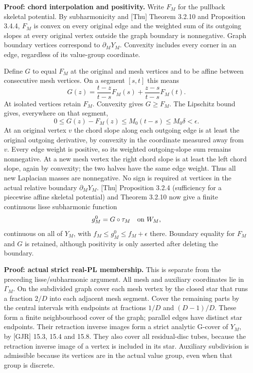 \documentclass[
  11pt,
]{article}
\begin{document}
\textbf{Proof: chord interpolation and positivity.} Write \(F_M\) for
the pullback skeletal potential. By subharmonicity and {[}Thu{]} Theorem
3.2.10 and Proposition 3.4.4, \(F_M\) is convex on every original edge
and the weighted sum of its outgoing slopes at every original vertex
outside the graph boundary is nonnegative. Graph boundary vertices
correspond to \(\partial_M Y_M\). Convexity includes every corner in an
edge, regardless of its value-group coordinate.

Define \(G\) to equal \(F_M\) at the original and mesh vertices and to
be affine between consecutive mesh vertices. On a segment \([s,t]\) this
means \[G(z)=\frac{t-z}{t-s}F_M(s)+\frac{z-s}{t-s}F_M(t).\] At isolated
vertices retain \(F_M\). Convexity gives \(G\ge F_M\). The Lipschitz
bound gives, everywhere on that segment,
\[0\le G(z)-F_M(z)\le M_0(t-s)\le M_0\delta<\epsilon.\] At an original
vertex \(v\) the chord slope along each outgoing edge is at least the
original outgoing derivative, by convexity in the coordinate measured
away from \(v\). Every edge weight is positive, so its weighted
outgoing-slope sum remains nonnegative. At a new mesh vertex the right
chord slope is at least the left chord slope, again by convexity; the
two halves have the same edge weight. Thus all new Laplacian masses are
nonnegative. No sign is required at vertices in the actual relative
boundary \(\partial_M Y_M\). {[}Thu{]} Proposition 3.2.4 (sufficiency
for a piecewise affine skeletal potential) and Theorem 3.2.10 now give a
finite continuous lisse subharmonic function
\[g_M^0=G\circ\tau_M\quad\hbox{on }W_M,\] continuous on all of \(Y_M\),
with \(f_M\le g_M^0\le f_M+\epsilon\) there. Boundary equality for
\(F_M\) and \(G\) is retained, although positivity is only asserted
after deleting the boundary.

\textbf{Proof: actual strict real-PL membership.} This is separate from
the preceding lisse/subharmonic argument. All mesh and auxiliary
coordinates lie in \(\Gamma_M\). On the subdivided graph cover each mesh
vertex by the closed star that runs a fraction \(2/D\) into each
adjacent mesh segment. Cover the remaining parts by the central
intervals with endpoints at fractions \(1/D\) and \((D-1)/D\). These
form a finite neighbourhood cover of the graph; parallel edges have
distinct star endpoints. Their retraction inverse images form a strict
analytic G-cover of \(Y_M\), by {[}GJR{]} 15.3, 15.4 and 15.8. They also
cover all residual-disc tubes, because the retraction inverse image of a
vertex is included in its star. Auxiliary subdivision is admissible
because its vertices are in the actual value group, even when that group
is discrete.
\end{document}
